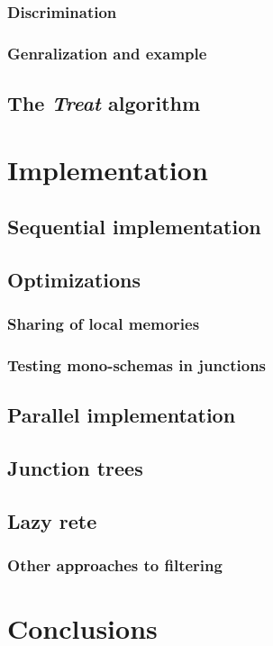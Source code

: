 \subsubsection{Discrimination}

\subsubsection{Genralization and example}

\subsection{The \textit{Treat} algorithm}

\section{Implementation}

\subsection{Sequential implementation}

\subsection{Optimizations}

\subsubsection{Sharing of local memories}

\subsubsection{Testing mono-schemas in junctions}

\subsection{Parallel implementation}

\subsection{Junction trees}

\subsection{Lazy rete}

\subsubsection{Other approaches to filtering}

\section{Conclusions}


